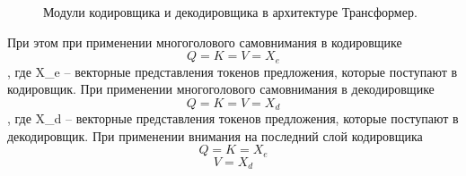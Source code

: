 \begin{figure}[ht]
 \caption{Модули кодировщика и декодировщика в архитектуре Трансформер.}\label{fig:Transformer4-EncoderDecoder}
\end{figure}

При этом при применении многоголового самовнимания в кодировщике
\begin{equation}
  Q = K = V = X_e
\end{equation},
где X\_e -- векторные представления токенов предложения, которые поступают в кодировщик.
При применении многоголового самовнимания в декодировщике
\begin{equation}
  Q = K = V = X_d
\end{equation},
где X\_d -- векторные представления токенов предложения, которые поступают в декодировщик.
При применении внимания на последний слой кодировщика
\begin{equation}
  Q = K = X_e
\end{equation}
\begin{equation}
  V = X_d
\end{equation}

